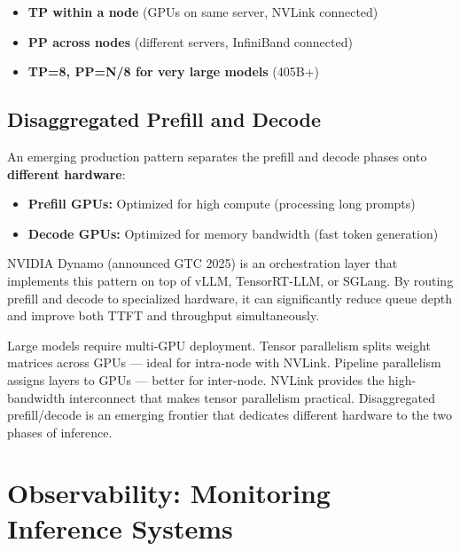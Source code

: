 \documentclass[11pt, twoside, openright]{book}
\newcommand{\tipbox}[2]{\begin{tcolorbox}[tipstyle, title={#1}]#2\end{tcolorbox}}
\newenvironment{chapsummary}
  {\begin{tcolorbox}[enhanced, breakable,
    colback={rgb,255:red,245;green,245;blue,225},
    colframe=AccentOrange, boxrule=1.5pt, arc=4pt,
    title={\bfseries Chapter Summary},
    fonttitle=\bfseries\color{white},
    attach boxed title to top left={yshift=-2mm, xshift=5mm},
    boxed title style={colback=AccentOrange, arc=2pt}]}
  {\end{tcolorbox}}
\begin{document}
\tipbox{The Parallelism Recipe}{
\begin{itemize}
  \item \textbf{TP within a node} (GPUs on same server, NVLink connected)
  \item \textbf{PP across nodes} (different servers, InfiniBand connected)
  \item \textbf{TP=8, PP=N/8 for very large models} (405B+)
\end{itemize}
}

\section{Disaggregated Prefill and Decode}

An emerging production pattern separates the prefill and decode phases onto
\textbf{different hardware}:

\begin{itemize}
  \item \textbf{Prefill GPUs:} Optimized for high compute (processing long prompts)
  \item \textbf{Decode GPUs:} Optimized for memory bandwidth (fast token generation)
\end{itemize}

NVIDIA Dynamo (announced GTC 2025) is an orchestration layer that implements this
pattern on top of vLLM, TensorRT-LLM, or SGLang.  By routing prefill and decode to
specialized hardware, it can significantly reduce queue depth and improve both TTFT
and throughput simultaneously.

\begin{chapsummary}
Large models require multi-GPU deployment.  Tensor parallelism splits weight
matrices across GPUs --- ideal for intra-node with NVLink.  Pipeline parallelism
assigns layers to GPUs --- better for inter-node.  NVLink provides the
high-bandwidth interconnect that makes tensor parallelism practical.  Disaggregated
prefill/decode is an emerging frontier that dedicates different hardware to the
two phases of inference.
\end{chapsummary}

\chapter{Observability: Monitoring Inference Systems}
\label{ch:observability}
\end{document}
